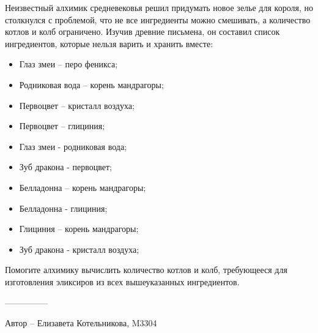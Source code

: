 \question
Неизвестный алхимик средневековья решил придумать новое зелье для короля, но столкнулся с проблемой, что не все ингредиенты можно смешивать, а количество котлов и колб ограничено. Изучив древние письмена, он составил список ингредиентов, которые нельзя варить и хранить вместе:

\begin{itemize}
\item Глаз змеи – перо феникса;

\item Родниковая вода – корень мандрагоры;

\item Первоцвет – кристалл воздуха;

\item Первоцвет – глициния;

\item Глаз змеи - родниковая вода;

\item Зуб дракона - первоцвет;

\item Белладонна – корень мандрагоры;

\item Белладонна - глициния;

\item Глициния – корень мандрагоры;

\item Зуб дракона - кристалл воздуха;
\end{itemize}

Помогите алхимику вычислить количество котлов и колб, требующееся для изготовления эликсиров из всех вышеуказанных ингредиентов.

---------------

Автор -- Елизавета Котельникова, M3304
